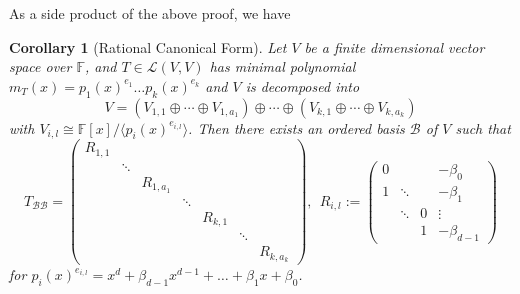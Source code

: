 \documentclass[12pt]{amsbook}
\newtheorem{corollary}[theorem]{Corollary}
\begin{document}
As a side product of the above proof, we have
\begin{corollary}[Rational Canonical Form] \label{cor-rcf}
Let $V$ be a finite dimensional vector space over $\mathbb{F}$, and $T \in \mathcal{L}(V,V)$ has minimal polynomial $m_T(x) = p_1(x)^{e_1} \dots p_k(x)^{e_k}$ and $V$ is decomposed into
$$V = (V_{1,1} \oplus \cdots \oplus V_{1,a_1}) \oplus \cdots \oplus (V_{k,1} \oplus \cdots \oplus V_{k,a_k})$$
with $V_{i,l} \cong \mathbb{F}[x]/\langle p_i(x)^{e_{i,l}} \rangle$. Then there exists an ordered basis $\mathcal{B}$ of $V$ such that 
    $$T_{\mathcal{B}\mathcal{B}} = \begin{pmatrix} R_{1,1} & & & & & \\
& \ddots & & & & & \\ 
& & R_{1,a_1} & & & & \\
& & & \ddots & & &\\
& & & & R_{k,1} & & \\
& & & & & \ddots & \\
& & & & & & R_{k,a_k}\end{pmatrix},\ \ R_{i,l} := \begin{pmatrix}
    0 &  &  &  -\beta_0 \\
    1 & \ddots     & &   -\beta_1 \\
    & \ddots & 0 &  \vdots \\ 
     &  & 1 & -\beta_{d-1}
\end{pmatrix}
$$
for $p_i(x)^{e_{i,l}} = x^d + \beta_{d-1}x^{d-1}+ \dots + \beta_1 x + \beta_0$.
\end{corollary}
\end{document}
